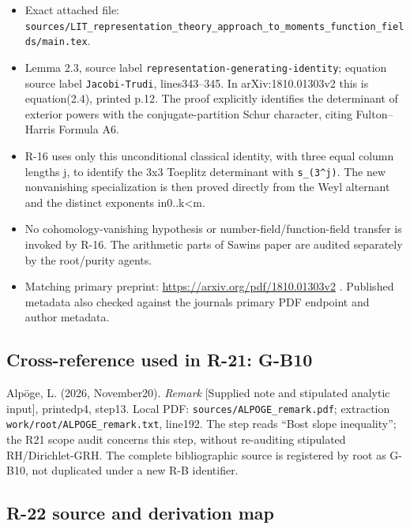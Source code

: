 \documentclass[11pt,a4paper]{article}
\providecommand{\tightlist}{\setlength{\itemsep}{0pt}\setlength{\parskip}{0pt}}
\theoremstyle{definition}\newtheorem{definition}{Definition}
\begin{document}
\begin{itemize}
\tightlist
\item
  Exact attached file:
  \nolinkurl{sources/LIT_representation_theory_approach_to_moments_function_fields/main.tex}.
\item
  Lemma 2.3, source label \nolinkurl{representation-generating-identity};
  equation source label \nolinkurl{Jacobi-Trudi}, lines343--345. In
  arXiv:1810.01303v2 this is equation(2.4), printed p.12. The proof
  explicitly identifies the determinant of exterior powers with the
  conjugate-partition Schur character, citing Fulton--Harris Formula A6.
\item
  R-16 uses only this unconditional classical identity, with three equal
  column lengths j, to identify the 3x3 Toeplitz determinant with
  \texttt{s\_(3\^{}j)}. The new nonvanishing specialization is then
  proved directly from the Weyl alternant and the distinct exponents
  in0..k\textless m.
\item
  No cohomology-vanishing hypothesis or number-field/function-field
  transfer is invoked by R-16. The arithmetic parts of
  Sawin\textquotesingle s paper are audited separately by the
  root/purity agents.
\item
  Matching primary preprint: \url{https://arxiv.org/pdf/1810.01303v2} .
  Published metadata also checked against the journal\textquotesingle s
  primary PDF endpoint and author metadata.
\end{itemize}

\subsection{Cross-reference used in R-21:
G-B10}\label{cross-reference-used-in-r-21-g-b10}

Alpöge, L. (2026, November20). \emph{Remark} {[}Supplied note and
stipulated analytic input{]}, printedp4, step13. Local PDF:
\nolinkurl{sources/ALPOGE_remark.pdf}; extraction
\nolinkurl{work/root/ALPOGE_remark.txt}, line192. The step reads ``Bost
slope inequality''; the R21 scope audit concerns this step, without
re-auditing stipulated RH/Dirichlet-GRH. The complete bibliographic
source is registered by root as G-B10, not duplicated under a new R-B
identifier.

\subsection{R-22 source and derivation
map}\label{r-22-source-and-derivation-map}
\end{document}
